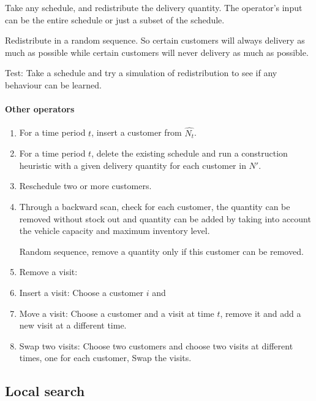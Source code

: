 \documentclass{article}
\begin{document}
 Take any schedule, and redistribute the delivery quantity. The operator's input can be the entire schedule or just a subset of the schedule. 

 Redistribute in a random sequence. So certain customers will always delivery as much as possible while certain customers will never delivery as much as possible. 

 Test: Take a schedule and try a simulation of redistribution to see if any behaviour can be learned.
 
\paragraph{Other operators}

\begin{enumerate}
   
    \item  For a time period $t$, insert a customer from $\hat{N_t}$. 
    
    
    \item  For a time period $t$, delete the existing schedule and run a construction heuristic with a given delivery quantity for each customer in $N'$.
    
    \item Reschedule two or more customers.
    
    \item Through a backward scan, check for each customer, the quantity can be removed without stock out and quantity can be added by taking into account the vehicle capacity and maximum inventory level.

    Random sequence, remove a quantity only if this customer can be removed.


    \item Remove a visit:
    \item Insert a visit: Choose a customer $i$ and 
    \item Move a visit: Choose a customer and a visit at time $t$, remove it and add a new visit at a different time.
    \item Swap two visits: Choose two customers and choose two visits at different times, one for each customer, Swap the visits.
     
\end{enumerate}
\subsection{Local search}
\end{document}
